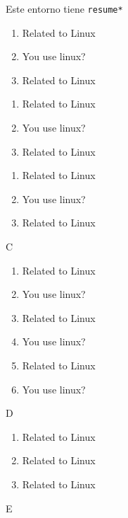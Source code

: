 \documentclass{article}
\begin{document}
Este entorno tiene \verb+resume*+

\begin{enumerate}[resume*]
  \item Related to Linux
  \item You use linux? %
  \item Related to Linux
\end{enumerate}

\stop

\begin{enumerate}[series=B]
  \item Related to Linux
  \item You use linux? %
  \item Related to Linux
\end{enumerate}

\begin{enumerate}[resume=A]
  \item Related to Linux
  \item You use linux? %
  \item Related to Linux
\end{enumerate}
\stop
C

\begin{enumerate}[resume=A]
  \item Related to Linux
  \item You use linux? %
  \item Related to Linux
  \item You use linux? %
  \item Related to Linux
  \item You use linux? %
\end{enumerate}

D

\begin{enumerate}[label={\roman*.)}]
  \item Related to Linux
  \item Related to Linux
  \item Related to Linux
\end{enumerate}

E
\end{document}
